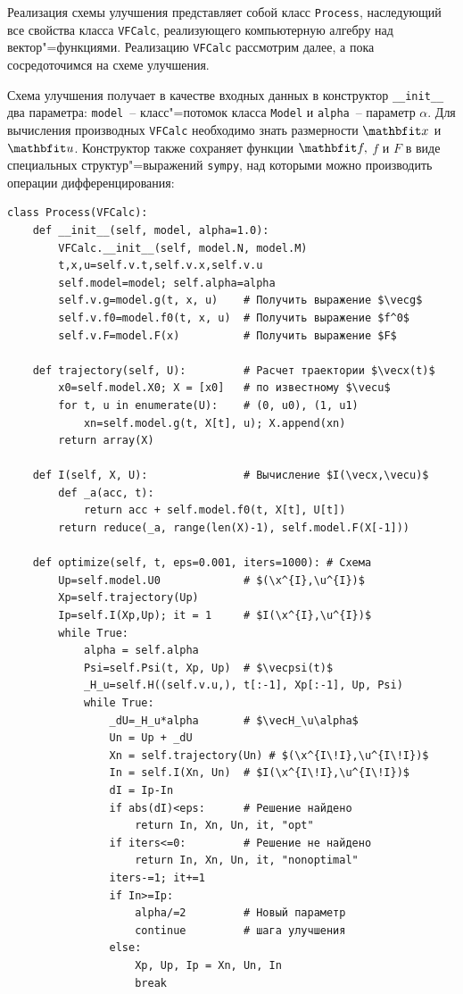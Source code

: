 \documentclass[a4paper,14pt, openany, twoside, draft]{extbook} %
\begin{document}
Реализация схемы улучшения представляет собой класс \texttt{Process}, наследующий все свойства класса \texttt{VFCalc}, реализующего компьютерную алгебру над вектор"=функциями.  Реализацию \texttt{VFCalc} рассмотрим далее, а пока сосредоточимся на схеме улучшения.

Схема улучшения получает в качестве входных данных в конструктор \texttt{\_\_init\_\_} два параметра: \texttt{model}~-- класс"=потомок класса \texttt{Model} и \texttt{alpha}~-- параметр $\alpha$.  Для вычисления производных \texttt{VFCalc} необходимо знать размерности $\vecx$ и $\vecu$.  Конструктор также сохраняет функции $\vecf,$ $f$ и $F$ в виде специальных структур"=выражений \texttt{sympy}, над которыми можно производить операции дифференцирования:

\begin{verbatim}
class Process(VFCalc):
    def __init__(self, model, alpha=1.0):
        VFCalc.__init__(self, model.N, model.M)
        t,x,u=self.v.t,self.v.x,self.v.u
        self.model=model; self.alpha=alpha
        self.v.g=model.g(t, x, u)    # Получить выражение $\vecg$
        self.v.f0=model.f0(t, x, u)  # Получить выражение $f^0$
        self.v.F=model.F(x)          # Получить выражение $F$

    def trajectory(self, U):         # Расчет траектории $\vecx(t)$
        x0=self.model.X0; X = [x0]   # по известному $\vecu$
        for t, u in enumerate(U):    # (0, u0), (1, u1)
            xn=self.model.g(t, X[t], u); X.append(xn)
        return array(X)

    def I(self, X, U):               # Вычисление $I(\vecx,\vecu)$
        def _a(acc, t):
            return acc + self.model.f0(t, X[t], U[t])
        return reduce(_a, range(len(X)-1), self.model.F(X[-1]))

    def optimize(self, t, eps=0.001, iters=1000): # Схема
        Up=self.model.U0             # $(\x^{I},\u^{I})$
        Xp=self.trajectory(Up)
        Ip=self.I(Xp,Up); it = 1     # $I(\x^{I},\u^{I})$
        while True:
            alpha = self.alpha
            Psi=self.Psi(t, Xp, Up)  # $\vecpsi(t)$
            _H_u=self.H((self.v.u,), t[:-1], Xp[:-1], Up, Psi)
            while True:
                _dU=_H_u*alpha       # $\vecH_\u\alpha$
                Un = Up + _dU
                Xn = self.trajectory(Un) # $(\x^{I\!I},\u^{I\!I})$
                In = self.I(Xn, Un)  # $I(\x^{I\!I},\u^{I\!I})$
                dI = Ip-In
                if abs(dI)<eps:      # Решение найдено
                    return In, Xn, Un, it, "opt"
                if iters<=0:         # Решение не найдено
                    return In, Xn, Un, it, "nonoptimal"
                iters-=1; it+=1
                if In>=Ip:
                    alpha/=2         # Новый параметр
                    continue         # шага улучшения
                else:
                    Xp, Up, Ip = Xn, Un, In
                    break
\end{verbatim}
\end{document}
